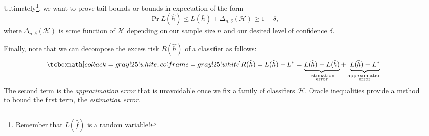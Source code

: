 Ultimately\footnote{Remember that $L(\hat f)$ is a random variable!}, we want to prove tail bounds or bounds in expectation of the form
\[
    \Pr{L(\hat h) \leq L(\bar h) + \Delta_{n, \delta}(\mathcal{H})} \geq 1 - \delta,
\]
where $\Delta_{n, \delta}(\mathcal{H})$ is some function of $\mathcal{H}$ depending on our sample size $n$ and our desired level of confidence $\delta$.

Finally, note that we can decompose the excess risk $R(\hat h)$ of a classifier as follows:
\[
    \highlightMath{
        R(\hat h) = L(\hat h) - L^* = \underbrace{L(\hat h) - L(\bar h)}_{\substack{\text{estimation} \\ \text{error}}} + \underbrace{L(\bar h) - L^*}_{\substack{\text{approximation} \\ \text{error}}}
    }
\]
The second term is the \emph{approximation error} that is unavoidable once we fix a family of classifiers $\mathcal{H}$. Oracle inequalities provide a method to bound the first term, the \emph{estimation error}.

